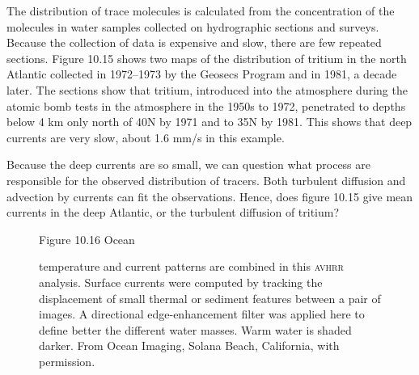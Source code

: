 The distribution of trace molecules is calculated from the
concentration of the molecules in water samples collected on
hydrographic sections and
surveys. Because the collection of data is expensive and slow, there
are few repeated sections. Figure 10.15 shows two maps of the
distribution of tritium in the north Atlantic collected in 1972--1973
by the Geosecs Program and in 1981, a decade later. The sections show
that tritium, introduced into the atmosphere during the atomic bomb
tests in the atmosphere in the 1950s to 1972, penetrated to depths
below 4 km only north of 40\degrees N by 1971 and to 35\degrees N by
1981. This shows that deep currents are very slow, about 1.6 mm/s in
this example.

Because the deep currents are so small, we can question what process
are responsible for the observed distribution of tracers. Both
turbulent diffusion and advection by currents can fit the
observations. Hence, does figure 10.15 give mean currents in the deep
Atlantic, or the turbulent diffusion of tritium?

\begin{figure}[t!]
\footnotesize
Figure 10.16 Ocean \rule{0mm}{4ex}temperature and current patterns are
combined in this \textsc{avhrr} analysis. Surface currents were computed by
tracking the displacement of small thermal or sediment features
between a pair of images. A directional edge-enhancement filter was
applied here to define better the different water masses. Warm water
is shaded darker. From Ocean Imaging, Solana Beach, California, with
permission.
\label{Fig10.16.bw}
\vspace{-4ex}
\end{figure}


